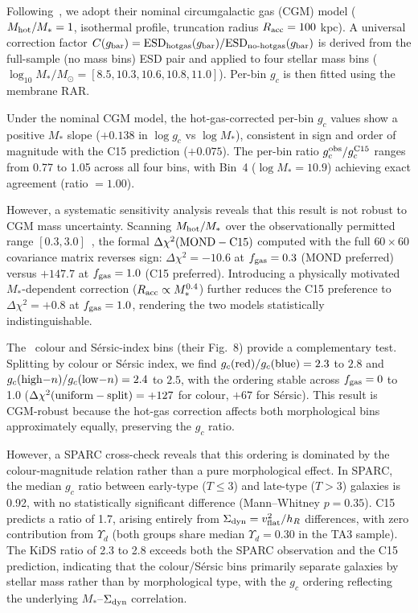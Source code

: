 \documentclass[11pt,a4paper]{article}
\newcommand{\gbar}{g_{\rm bar}}
\newcommand{\gc}{g_{c}}
\newcommand{\vflat}{v_{\rm flat}}
\newcommand{\hR}{h_{R}}
\newcommand{\Yd}{\Upsilon_{d}}
\newcommand{\sigdyn}{\Sigma_{\rm dyn}}
\newcommand{\fgas}{f_{\rm gas}}
\newcommand{\chisq}{\chi^{2}}
\begin{document}
Following~\citet{Brouwer2021}, we adopt their nominal circumgalactic gas (CGM) model
($M_{\rm hot}/M_\ast = 1$, isothermal profile, truncation radius $R_{\rm acc} = 100$ kpc). A universal
correction factor $C(\gbar) = {\rm ESD}_{\rm hotgas}(\gbar)/{\rm ESD}_{\rm no\text{-}hotgas}(\gbar)$ is derived
from the full-sample (no mass bins) ESD pair and applied to four stellar mass bins
($\log_{10} M_\ast/M_\odot = [8.5, 10.3, 10.6, 10.8, 11.0]$). Per-bin $\gc$ is then fitted using the membrane RAR.

Under the nominal CGM model, the hot-gas-corrected per-bin $\gc$ values show a positive $M_\ast$ slope
($+0.138$ in $\log\gc$ vs $\log M_\ast$), consistent in sign and order of magnitude with the C15 prediction
($+0.075$). The per-bin ratio $\gc^{\rm obs}/\gc^{\rm C15}$ ranges from 0.77 to 1.05 across all four bins,
with Bin~4 ($\log M_\ast = 10.9$) achieving exact agreement (ratio $= 1.00$).

However, a systematic sensitivity analysis reveals that this result is not robust to CGM mass uncertainty.
Scanning $M_{\rm hot}/M_\ast$ over the observationally permitted range $[0.3, 3.0]$~\citep{Tumlinson2017,
Babyk2018}, the formal $\Delta\chisq({\rm MOND} - {\rm C15})$ computed with the full $60 \times 60$
covariance matrix reverses sign: $\Delta\chisq = -10.6$ at $\fgas = 0.3$ (MOND preferred) versus $+147.7$ at
$\fgas = 1.0$ (C15 preferred). Introducing a physically motivated $M_\ast$-dependent correction
($R_{\rm acc} \propto M_\ast^{0.4}$) further reduces the C15 preference to $\Delta\chisq = +0.8$ at
$\fgas = 1.0$, rendering the two models statistically indistinguishable.

\begin{sloppypar}
The~\citet{Brouwer2021} colour and S\'ersic-index bins (their Fig.~8) provide a complementary test.
Splitting by colour or S\'ersic index, we find $\gc({\rm red})/\gc({\rm blue}) = 2.3$ to $2.8$ and
$\gc({\rm high-}n)/\gc({\rm low-}n) = 2.4$ to $2.5$, with the ordering stable across $\fgas = 0$ to 1.0
($\Delta\chisq({\rm uniform} - {\rm split}) = +127$ for colour, $+67$ for S\'ersic). This result is
CGM-robust because the hot-gas correction affects both morphological bins approximately equally, preserving
the $\gc$ ratio.
\end{sloppypar}

However, a SPARC cross-check reveals that this ordering is dominated by the colour-magnitude relation rather
than a pure morphological effect. In SPARC, the median $\gc$ ratio between early-type ($T \le 3$) and
late-type ($T > 3$) galaxies is 0.92, with no statistically significant difference (Mann--Whitney $p = 0.35$).
C15 predicts a ratio of 1.7, arising entirely from $\sigdyn = \vflat^2/\hR$ differences, with zero
contribution from $\Yd$ (both groups share median $\Yd = 0.30$ in the TA3 sample). The KiDS ratio of 2.3 to
2.8 exceeds both the SPARC observation and the C15 prediction, indicating that the colour/S\'ersic bins
primarily separate galaxies by stellar mass rather than by morphological type, with the $\gc$ ordering
reflecting the underlying $M_\ast$--$\sigdyn$ correlation.
\end{document}
